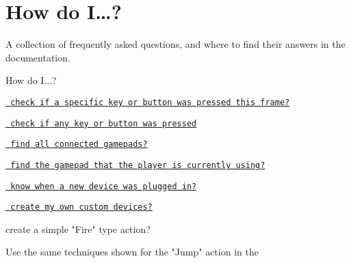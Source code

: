\chapter{How do I…?}
\hypertarget{md__hey_tea_9_2_library_2_package_cache_2com_8unity_8inputsystem_0d1_86_83_2_documentation_0i_2_how_do_i}{}\label{md__hey_tea_9_2_library_2_package_cache_2com_8unity_8inputsystem_0d1_86_83_2_documentation_0i_2_how_do_i}
\label{md__hey_tea_9_2_library_2_package_cache_2com_8unity_8inputsystem_0d1_86_83_2_documentation_0i_2_how_do_i_autotoc_md1395}%
%
 A collection of frequently asked questions, and where to find their answers in the documentation.

How do I...?


\begin{DoxyItemize}
\item \href{../api/UnityEngine.InputSystem.Controls.ButtonControl.html\#UnityEngine_InputSystem_Controls_ButtonControl_wasPressedThisFrame}{\texttt{ check if a specific key or button was pressed this frame?}}
\item \href{../api/UnityEngine.InputSystem.InputSystem.html\#UnityEngine_InputSystem_InputSystem_onAnyButtonPress}{\texttt{ check if any key or button was pressed}}
\item \href{../api/UnityEngine.InputSystem.Gamepad.html\#UnityEngine_InputSystem_Gamepad_all}{\texttt{ find all connected gamepads?}}
\item \href{../api/UnityEngine.InputSystem.Gamepad.html\#UnityEngine_InputSystem_Gamepad_current}{\texttt{ find the gamepad that the player is currently using?}}
\item \href{Devices.md\#monitoring-devices}{\texttt{ know when a new device was plugged in?}}
\item \href{HID.md\#creating-a-custom-device-layout}{\texttt{ create my own custom devices?}}
\item create a simple "{}\+Fire"{} type action?
\end{DoxyItemize}Use the same techniques shown for the "{}\+Jump"{} action in the 


